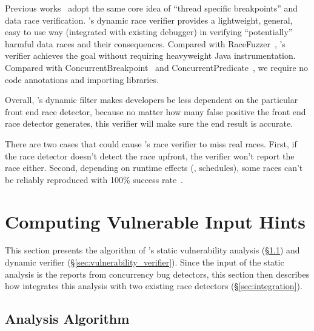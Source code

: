 
Previous works~\cite{racefuzzer, conbreak, conpredicates} adopt the same core
idea of “thread specific breakpoints” and
data race verification. \xxx's dynamic race verifier provides a lightweight,
general, easy to use way (integrated with existing debugger)
in verifying “potentially” harmful data races and their consequences.
Compared with RaceFuzzer~\cite{racefuzzer}, \xxx's verifier achieves the goal 
without requiring heavyweight Java instrumentation. Compared with
ConcurrentBreakpoint~\cite{conbreak} and ConcurrentPredicate~\cite{conpredicates},
we require no code annotations and importing libraries.

Overall, \xxx's dynamic filter makes developers be less dependent on 
the particular front end race detector, because no matter how many false 
positive the front end race detector generates, this verifier will make sure 
the end result is accurate.

There are two cases that could cause \xxx's race verifier to miss real races. First, if the 
race detector doesn't detect the race upfront, the verifier won't report the 
race either. Second, depending on runtime effects (\eg, schedules), some races 
can't be reliably reproduced with 100\% success rate~\cite{conpredicates}.

\section{Computing Vulnerable Input Hints} \label{sec:input-reduction}

This section presents the algorithm of \xxx's static vulnerability 
analysis (\S\ref{sec:algo}) and dynamic verifier 
(\S\ref{sec:vulnerability_verifier}). Since the input of the static 
analysis is the reports from concurrency bug detectors, this section then 
describes how \xxx integrates this analysis with two existing race 
detectors (\S\ref{sec:integration}).

\subsection{Analysis Algorithm} \label{sec:algo}

